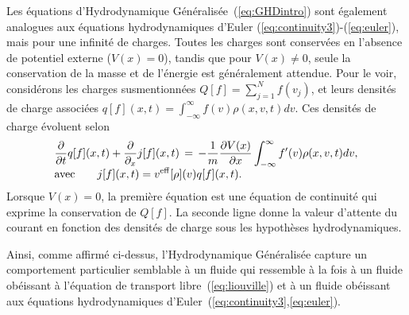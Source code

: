 Les équations d'Hydrodynamique Généralisée~(\ref{eq:GHDintro}) sont également analogues aux équations hydrodynamiques d'Euler (\ref{eq:continuity3})-(\ref{eq:euler}), mais pour une infinité de charges. Toutes les charges sont conservées en l'absence de potentiel externe (\(V(x) = 0\)), tandis que pour \(V(x) \neq 0\), seule la conservation de la masse et de l'énergie est généralement attendue. Pour le voir, considérons les charges susmentionnées \(Q[f] = \sum_{j=1}^N f(v_j)\), et leurs densités de charge associées \(q[f](x,t) = \int_{-\infty}^\infty f(v) \rho(x,v,t) dv\). Ces densités de charge évoluent selon
\begin{equation}
    \label{eq:introGHD_continuity}
    \begin{array}{l}
   \displaystyle     \frac{\partial}{\partial t} q[f](x,t) + \frac{\partial}{\partial_x} j[f](x,t) \, = \, -\frac{1}{m} \frac{\partial V(x)}{\partial x} \int_{-\infty}^\infty  f'(v) \rho(x,v,t)  dv, \\
   \displaystyle {\rm avec}  \qquad j[f](x,t) = v^{\rm eff}[\rho](v) q[f](x,t) .
    \end{array}
\end{equation}
Lorsque \(V(x) = 0\), la première équation est une équation de continuité qui exprime la conservation de \(Q[f]\). La seconde ligne donne la valeur d'attente du courant en fonction des densités de charge sous les hypothèses hydrodynamiques.

Ainsi, comme affirmé ci-dessus, l'Hydrodynamique Généralisée capture un comportement particulier semblable à un fluide qui ressemble à la fois à un fluide obéissant à l'équation de transport libre~(\ref{eq:liouville}) et à un fluide obéissant aux équations hydrodynamiques d'Euler~(\ref{eq:continuity3},\ref{eq:euler}).

\vspace{0.5cm}

